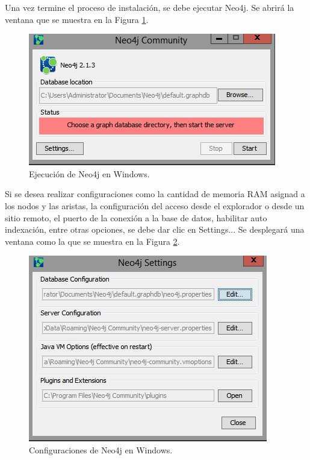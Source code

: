 \documentclass[conference]{IEEEtran}
\begin{document}
Una vez termine el proceso de instalación, se debe ejecutar Neo4j. Se abrirá la ventana que se muestra en la Figura \ref{fig4}.

\begin{figure}[H]
\begin{center}
\includegraphics[width= 0.45 \textwidth]{neo4j_install06.png}
\end{center}
\caption{Ejecución de Neo4j en Windows.}
\label{fig4}
\end{figure}

Si se desea realizar configuraciones como
la cantidad de memoria RAM asignad a los nodos y las aristas, la configuración del acceso desde el explorador o desde un sitio remoto, el puerto de la conexión a la base de datos, habilitar auto indexación, entre otras opciones, se debe dar clic en Settings... Se desplegará una ventana como la que se muestra en la Figura \ref{fig5}.

\begin{figure}[H]
\begin{center}
\includegraphics[width= 0.45 \textwidth]{neo4j_install07.png}
\end{center}
\caption{Configuraciones de Neo4j en Windows.}
\label{fig5}
\end{figure}
\end{document}
